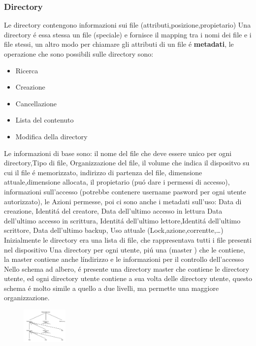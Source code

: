 \subsubsection{Directory}
Le directory contengono informazioni sui file (attributi,posizione,propietario) Una directory é essa stessa un file (speciale)
e fornisce il mapping tra i nomi dei file e i file stessi, un altro modo per chiamare gli attributi di un file é \textbf{metadati},
le operazione che sono possibili sulle directory sono:
\begin{itemize}
    \item Ricerca
    \item Creazione
    \item Cancellazione
    \item Lista del contenuto
    \item Modifica della directory
\end{itemize}
Le informazioni di base sono: il nome del file che deve essere unico per ogni directory,Tipo di file, Organizzazione del file, il
volume che indica il dispositvo su cui il file é memorizzato, indirizzo di partenza del file, dimensione attuale,dimensione allocata,
il propietario (puó dare i permessi di accesso), informazioni sull'accesso (potrebbe contenere username pasword per ogni utente autorizzato),
le Azioni permesse, poi ci sono anche i metadati sull'uso: Data di creazione, Identitá del creatore, Data dell'ultimo accesso in lettura
Data dell'ultimo accesso in scrittura, Identitá dell'ultimo lettore,Identitá dell'ultimo scrittore, Data dell'ultimo backup, Uso attuale (Lock,azione,correntte,\ldots)
Inizialmente le directory era una lista di file, che rappresentava tutti i file presenti nel dispositivo
Una directory per ogni utente, piú una (master ) che le contiene, la master contiene anche líndirizzo e le informazioni per
il controllo dell'accesso
Nello schema ad albero, é presente una directory master che contiene le directory utente, ed ogni directory utente contiene
a sua volta delle directory utente, questo schema é molto simile a quello a due livelli, ma permette una maggiore organizzazione.
\begin{figure}
    \centering
    \includegraphics[width=0.2\textwidth]{immagini/DirectoryAlbero}
\end{figure}
